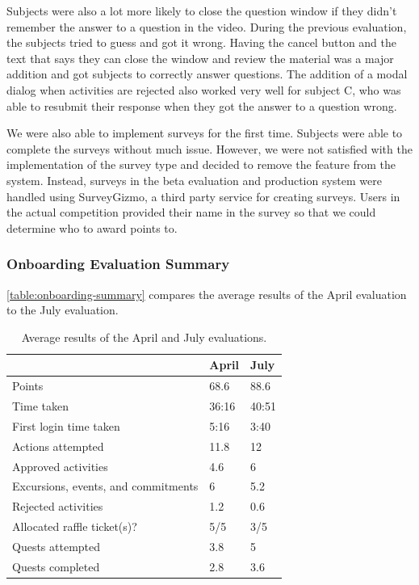 Subjects were also a lot more likely to close the question window if they didn't remember the answer to a question in the video. During the previous evaluation, the subjects tried to guess and got it wrong. Having the cancel button and the text that says they can close the window and review the material was a major addition and got subjects to correctly answer questions. The addition of a modal dialog when activities are rejected also worked very well for subject C, who was able to resubmit their response when they got the answer to a question wrong.

We were also able to implement surveys for the first time. Subjects were able to complete the surveys without much issue. However, we were not satisfied with the implementation of the survey type and decided to remove the feature from the system. Instead, surveys in the beta evaluation and production system were handled using SurveyGizmo, a third party service for creating surveys. Users in the actual competition provided their name in the survey so that we could determine who to award points to.

\subsubsection{Onboarding Evaluation Summary}

\autoref{table:onboarding-summary} compares the average results of the April evaluation to the July evaluation.

\begin{table}[t]
	\begin{tabular}{| l || l | l |}
		\hline
		& April & July \\
		\hline
		Points & 68.6 & 88.6 \\
		Time taken & 36:16 & 40:51 \\
    First login time taken & 5:16 & 3:40 \\
    Actions attempted & 11.8 & 12 \\
    Approved activities & 4.6 & 6 \\
    Excursions, events, and commitments & 6 & 5.2 \\
    Rejected activities & 1.2 & 0.6 \\
    Allocated raffle ticket(s)? & 5/5 & 3/5 \\
    Quests attempted & 3.8 & 5 \\
    Quests completed & 2.8 & 3.6 \\
		\hline
	\end{tabular}
	\caption{Average results of the April and July evaluations.}
	\label{table:onboarding-summary}
\end{table}

